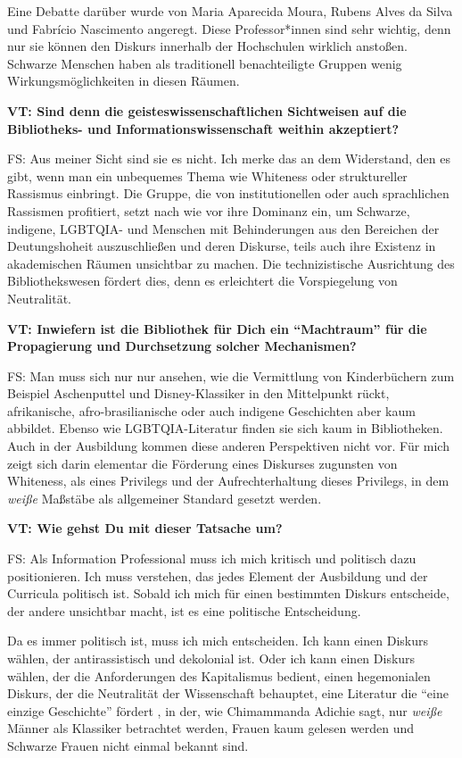 \documentclass[a4paper,
fontsize=11pt,
oneside,
numbers=noperiodatend,
parskip=half-,
bibliography=totoc,
final
]{scrartcl}
\begin{document}
Eine Debatte darüber wurde von Maria Aparecida Moura, Rubens Alves da
Silva und Fabrício Nascimento angeregt. Diese Professor*innen sind sehr
wichtig, denn nur sie können den Diskurs innerhalb der Hochschulen
wirklich anstoßen. Schwarze Menschen haben als traditionell
benachteiligte Gruppen wenig Wirkungsmöglichkeiten in diesen Räumen.

\textbf{VT: Sind denn die geisteswissenschaftlichen Sichtweisen auf die
Bibliotheks- und Informationswissenschaft weithin akzeptiert?}

FS: Aus meiner Sicht sind sie es nicht. Ich merke das an dem Widerstand,
den es gibt, wenn man ein unbequemes Thema wie Whiteness oder
struktureller Rassismus einbringt. Die Gruppe, die von institutionellen
oder auch sprachlichen Rassismen profitiert, setzt nach wie vor ihre
Dominanz ein, um Schwarze, indigene, LGBTQIA- und Menschen mit
Behinderungen aus den Bereichen der Deutungshoheit auszuschließen und
deren Diskurse, teils auch ihre Existenz in akademischen Räumen
unsichtbar zu machen. Die technizistische Ausrichtung des
Bibliothekswesen fördert dies, denn es erleichtert die Vorspiegelung von
Neutralität.

\textbf{VT: Inwiefern ist die Bibliothek für Dich ein
\enquote{Machtraum} für die Propagierung und Durchsetzung solcher
Mechanismen?}

FS: Man muss sich nur nur ansehen, wie die Vermittlung von Kinderbüchern
zum Beispiel Aschenputtel und Disney-Klassiker in den Mittelpunkt rückt,
afrikanische, afro-brasilianische oder auch indigene Geschichten aber
kaum abbildet. Ebenso wie LGBTQIA-Literatur finden sie sich kaum in
Bibliotheken. Auch in der Ausbildung kommen diese anderen Perspektiven
nicht vor. Für mich zeigt sich darin elementar die Förderung eines
Diskurses zugunsten von Whiteness, als eines Privilegs und der
Aufrechterhaltung dieses Privilegs, in dem \emph{weiße} Maßstäbe als
allgemeiner Standard gesetzt werden.

\textbf{VT: Wie gehst Du mit dieser Tatsache um?}

FS: Als Information Professional muss ich mich kritisch und politisch
dazu positionieren. Ich muss verstehen, das jedes Element der Ausbildung
und der Curricula politisch ist. Sobald ich mich für einen bestimmten
Diskurs entscheide, der andere unsichtbar macht, ist es eine politische
Entscheidung.

Da es immer politisch ist, muss ich mich entscheiden. Ich kann einen
Diskurs wählen, der antirassistisch und dekolonial ist. Oder ich kann
einen Diskurs wählen, der die Anforderungen des Kapitalismus bedient,
einen hegemonialen Diskurs, der die Neutralität der Wissenschaft
behauptet, eine Literatur die \enquote{eine einzige Geschichte} fördert
, in der, wie Chimammanda Adichie sagt, nur \emph{weiße} Männer als
Klassiker betrachtet werden, Frauen kaum gelesen werden und Schwarze
Frauen nicht einmal bekannt sind.
\end{document}
